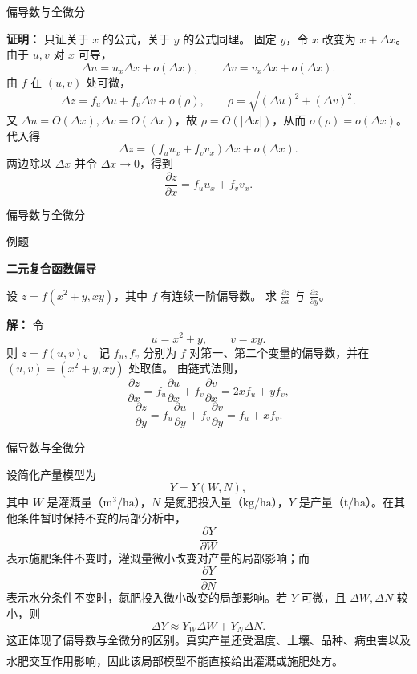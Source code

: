 \documentclass[aspectratio=169,10pt,fontset=fandol]{ctexbeamer}
\newcommand{\upcite}[1]{\textsuperscript{\textsuperscript{\cite{#1}}}}
\begin{document}
\begin{frame}[t,fragile]{偏导数与全微分}
\footnotesize
{\footnotesize
\textbf{证明：}
只证关于 $x$ 的公式，关于 $y$ 的公式同理。 固定 $y$，令 $x$ 改变为 $x+\Delta x$。 由于 $u,v$ 对 $x$ 可导，
\[
\Delta u=u_x\Delta x+o(\Delta x),\qquad
\Delta v=v_x\Delta x+o(\Delta x).
\]
由 $f$ 在 $(u,v)$ 处可微，
\[
\Delta z=f_u\Delta u+f_v\Delta v+o(\rho),
\qquad \rho=\sqrt{(\Delta u)^2+(\Delta v)^2}.
\]
又 $\Delta u=O(\Delta x),\Delta v=O(\Delta x)$，故 $\rho=O(|\Delta x|)$，从而 $o(\rho)=o(\Delta x)$。 代入得
\[
\Delta z=(f_u u_x+f_v v_x)\Delta x+o(\Delta x).
\]
两边除以 $\Delta x$ 并令 $\Delta x\to0$，得到
\[
\frac{\partial z}{\partial x}=f_u u_x+f_v v_x.
\]

}
\end{frame}
\begin{frame}[t,fragile]{偏导数与全微分}
\normalsize
\begin{block}{例题}
{\normalsize
\textbf{二元复合函数偏导}\par

设 $z=f(x^2+y,xy)$，其中 $f$ 有连续一阶偏导数。 求 $\frac{\partial z}{\partial x}$ 与 $\frac{\partial z}{\partial y}$。

}
\end{block}
\pause
{\normalsize
\textbf{解：}
令
\[
u=x^2+y,\qquad v=xy.
\]
则 $z=f(u,v)$。 记 $f_u,f_v$ 分别为 $f$ 对第一、第二个变量的偏导数，并在 $(u,v)=(x^2+y,xy)$ 处取值。 由链式法则，
\[
\frac{\partial z}{\partial x}
=f_u\frac{\partial u}{\partial x}+f_v\frac{\partial v}{\partial x}
=2x f_u+y f_v,
\]
\[
\frac{\partial z}{\partial y}
=f_u\frac{\partial u}{\partial y}+f_v\frac{\partial v}{\partial y}
=f_u+x f_v.
\]

}
\end{frame}
\begin{frame}[t,fragile]{偏导数与全微分}
\normalsize
{\normalsize
\begin{application}[作物产量对水分和氮肥的敏感性]
设简化产量模型为
\[
Y=Y(W,N),
\]
其中 $W$ 是灌溉量（$\mathrm{m^3/ha}$），$N$ 是氮肥投入量（$\mathrm{kg/ha}$），$Y$ 是产量（$\mathrm{t/ha}$）。在其他条件暂时保持不变的局部分析中，
\[
\frac{\partial Y}{\partial W}
\]
表示施肥条件不变时，灌溉量微小改变对产量的局部影响；而
\[
\frac{\partial Y}{\partial N}
\]
表示水分条件不变时，氮肥投入微小改变的局部影响。若 $Y$ 可微，且 $\Delta W,\Delta N$ 较小，则
\[
\Delta Y\approx Y_W\Delta W+Y_N\Delta N.
\]
这正体现了偏导数与全微分的区别。真实产量还受温度、土壤、品种、病虫害以及水肥交互作用影响，因此该局部模型不能直接给出灌溉或施肥处方。\upcite{TaizPlant}
\end{application}
}
\end{frame}
\end{document}
